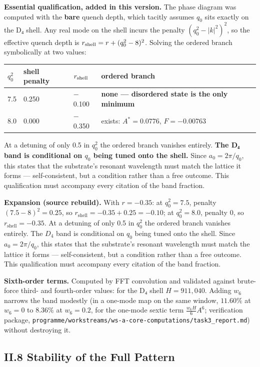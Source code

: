 \documentclass[a4paper,11pt]{article}
\newcommand{\expansion}[1]{\par\smallskip\noindent\textbf{Expansion (source rebuild).} #1\par\smallskip}
\begin{document}
\textbf{Essential qualification, added in this version.} The phase diagram was computed with the \textbf{bare} quench depth, which tacitly assumes $q_0$ sits exactly on the D₄ shell. Any real mode on the shell incurs the penalty $(q_0^2-|k|^2)^2$, so the effective quench depth is $r_{\rm shell}=r+(q_0^2-8)^2$. Solving the ordered branch symbolically at two values:

\begin{center}
\begin{xltabular}{\linewidth}{lllX}
\hline
$q_0^2$ & shell penalty & $r_{\rm shell}$ & ordered branch \\
 & 0.250 & $-$0.100 & \textbf{none — disordered state is the only minimum} \\
8.0 & 0.000 & $-$0.350 & exists: $A^{*}=0.0776$, $F=-0.00763$ \\
\hline
\end{xltabular}
\end{center}

At a detuning of only 0.5 in $q_0^2$ the ordered branch vanishes entirely. \textbf{The D₄ band is conditional on $q_0$ being tuned onto the shell.} Since $a_0=2\pi/q_0$, this states that the substrate's resonant wavelength must match the lattice it forms — self-consistent, but a condition rather than a free outcome. This qualification must accompany every citation of the band fraction.


\expansion{With $r = -0.35$: at $q_0^2 = 7.5$, penalty $(7.5-8)^2 = 0.25$, so $r_{\mathrm{shell}} = -0.35 + 0.25 = -0.10$; at $q_0^2 = 8.0$, penalty $0$, so $r_{\mathrm{shell}} = -0.35$. At a detuning of only 0.5 in $q_0^2$ the ordered branch vanishes entirely. The $D_4$ band is conditional on $q_0$ being tuned onto the shell. Since $a_0 = 2\pi/q_0$, this states that the substrate's resonant wavelength must match the lattice it forms --- self-consistent, but a condition rather than a free outcome. This qualification must accompany every citation of the band fraction.}
\textbf{Sixth-order terms.} Computed by FFT convolution and validated against brute-force third- and fourth-order values: for the D₄ shell $H=911{,}040$. Adding $w_6$ narrows the band modestly (in a one-mode map on the same window, $11.60\%$ at $w_6=0$ to $8.36\%$ at $w_6=0.2$, for the one-mode sextic term $\tfrac{w_6H}{6}A^6$; verification package, \texttt{programme/workstreams/ws-a-core-computations/task3\_report.md}) without destroying it.

\subsection*{II.8 Stability of the Full Pattern}
\end{document}
